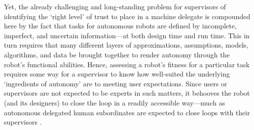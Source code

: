 Yet, the already challenging and long-standing problem for supervisors of identifying the `right level' of trust to place in a machine delegate \cite{Muir1994-ow} is compounded here by the fact that tasks for autonomous robots are defined by incomplete, imperfect, and uncertain information---at both design time and run time. This in turn requires that many different layers of approximations, assumptions, models, algorithms, and data be brought together to render autonomy through the robot's functional abilities. Hence, assessing a robot's fitness for a particular task requires some way for a supervisor to know how well-suited the underlying `ingredients of autonomy' are to meeting user expectations. Since users or supervisors are not expected to be experts in such matters, it behooves the robot (and its designers) to close the loop in a readily accessible way---much as autonomous delegated human subordinates are expected to close loops with their supervisors \cite{Miller2014-av}. 

